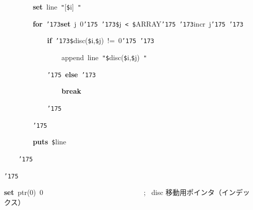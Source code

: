 \documentclass[a4paper,10pt]{article}
\def\mc{\relax}
\begin{document}
\noindent
\mbox{}{\tt\mc \ }{\tt\mc \ }{\tt\mc \ }{\tt\mc \ }{\tt\mc \ }{\tt\mc \ }{\tt\mc \ }{\tt\mc \ }\textbf{set}{\tt\mc \ }line{\tt\mc \ }{\tt "}{\tt{}}[{\tt\$}i{\tt{}}]{\tt\mc \ }{\tt "}

\noindent
\mbox{}{\tt\mc \ }{\tt\mc \ }{\tt\mc \ }{\tt\mc \ }{\tt\mc \ }{\tt\mc \ }{\tt\mc \ }{\tt\mc \ }\textbf{for}{\tt\mc \ }{\tt\char'173}\textbf{set}{\tt\mc \ }j{\tt\mc \ }0{\tt\char'175}{\tt\mc \ }{\tt\char'173}{\tt\$}j{\tt\mc \ }{\tt <}{\tt\mc \ }{\tt\$}ARRAY{\tt\char'175}{\tt\mc \ }{\tt\char'173}incr{\tt\mc \ }j{\tt\char'175}{\tt\mc \ }{\tt\char'173}

\noindent
\mbox{}{\tt\mc \ }{\tt\mc \ }{\tt\mc \ }{\tt\mc \ }{\tt\mc \ }{\tt\mc \ }{\tt\mc \ }{\tt\mc \ }{\tt\mc \ }{\tt\mc \ }{\tt\mc \ }{\tt\mc \ }\textbf{if}{\tt\mc \ }{\tt\char'173}{\tt\$}disc({\tt\$}i,{\tt\$}j){\tt\mc \ }!={\tt\mc \ }0{\tt\char'175}{\tt\mc \ }{\tt\char'173}

\noindent
\mbox{}{\tt\mc \ }{\tt\mc \ }{\tt\mc \ }{\tt\mc \ }{\tt\mc \ }{\tt\mc \ }{\tt\mc \ }{\tt\mc \ }{\tt\mc \ }{\tt\mc \ }{\tt\mc \ }{\tt\mc \ }{\tt\mc \ }{\tt\mc \ }{\tt\mc \ }{\tt\mc \ }append{\tt\mc \ }line{\tt\mc \ }{\tt "}{\tt\$}disc({\tt\$}i,{\tt\$}j){\tt\mc \ }{\tt "}

\noindent
\mbox{}{\tt\mc \ }{\tt\mc \ }{\tt\mc \ }{\tt\mc \ }{\tt\mc \ }{\tt\mc \ }{\tt\mc \ }{\tt\mc \ }{\tt\mc \ }{\tt\mc \ }{\tt\mc \ }{\tt\mc \ }{\tt\char'175}{\tt\mc \ }\textbf{else}{\tt\mc \ }{\tt\char'173}

\noindent
\mbox{}{\tt\mc \ }{\tt\mc \ }{\tt\mc \ }{\tt\mc \ }{\tt\mc \ }{\tt\mc \ }{\tt\mc \ }{\tt\mc \ }{\tt\mc \ }{\tt\mc \ }{\tt\mc \ }{\tt\mc \ }{\tt\mc \ }{\tt\mc \ }{\tt\mc \ }{\tt\mc \ }\textbf{break}

\noindent
\mbox{}{\tt\mc \ }{\tt\mc \ }{\tt\mc \ }{\tt\mc \ }{\tt\mc \ }{\tt\mc \ }{\tt\mc \ }{\tt\mc \ }{\tt\mc \ }{\tt\mc \ }{\tt\mc \ }{\tt\mc \ }{\tt\char'175}

\noindent
\mbox{}{\tt\mc \ }{\tt\mc \ }{\tt\mc \ }{\tt\mc \ }{\tt\mc \ }{\tt\mc \ }{\tt\mc \ }{\tt\mc \ }{\tt\char'175}

\noindent
\mbox{}{\tt\mc \ }{\tt\mc \ }{\tt\mc \ }{\tt\mc \ }{\tt\mc \ }{\tt\mc \ }{\tt\mc \ }{\tt\mc \ }\textbf{puts}{\tt\mc \ }{\tt\$}line

\noindent
\mbox{}{\tt\mc \ }{\tt\mc \ }{\tt\mc \ }{\tt\mc \ }{\tt\char'175}

\noindent
\mbox{}{\tt\char'175}

\noindent
\mbox{}\hfill

\noindent
\mbox{}\textbf{set}{\tt\mc \ }ptr(0){\tt\mc \ }0{\tt\mc \ }{\tt\mc \ }{\tt\mc \ }{\tt\mc \ }{\tt\mc \ }{\tt\mc \ }{\tt\mc \ }{\tt\mc \ }{\tt\mc \ }{\tt\mc \ }{\tt\mc \ }{\tt\mc \ }{\tt\mc \ }{\tt\mc \ }{\tt\mc \ }{\tt\mc \ }{\tt\mc \ }{\tt\mc \ }{\tt\mc \ }{\tt\mc \ }{\tt\mc \ }{\tt\mc \ }{\tt\mc \ }{\tt\mc \ }{\tt\mc \ }{\tt\mc \ }{\tt\mc \ }{\tt\mc \ };\rm\mc {\tt\#} \ disc 移動用ポインタ（インデックス）\hfill 
\tt\mc 
\end{document}
